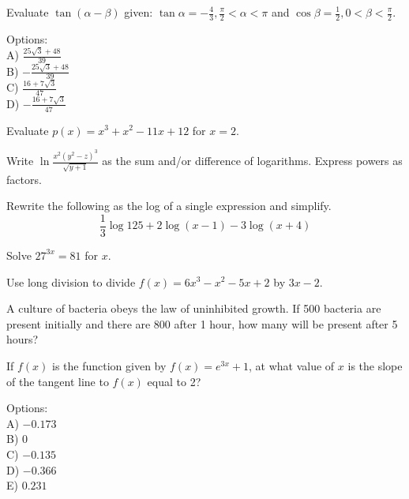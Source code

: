 \begin{problem}\label{AI-Trigonometry2}
Evaluate \( \tan(\alpha - \beta) \) given: \( \tan\alpha = -\frac{4}{3}, \frac{\pi}{2} < \alpha < \pi \) and \( \cos\beta = \frac{1}{2}, 0 < \beta < \frac{\pi}{2} \).

\noindent Options:\\
A) \( \frac{25\sqrt{3} + 48}{39} \)\\
B) \( -\frac{25\sqrt{3} + 48}{39} \)\\
C) \( \frac{16 + 7\sqrt{3}}{47} \)\\
D) \( -\frac{16 + 7\sqrt{3}}{47} \)
\end{problem}

\begin{problem}\label{PreCal-33}
 Evaluate $p(x)=x^{3}+x^{2}-11 x+12$ for $x=2$.
\end{problem}



\begin{problem}\label{PreCal-35}
Write $\ln \frac{x^{2}\left(y^{2}-z\right)^{3}}{\sqrt{y+1}}$ as the sum and/or difference of logarithms. Express powers as factors.
 \end{problem}


\begin{problem}\label{PreCal-36}
 Rewrite the following as the log of a single expression and simplify.
$$
\frac{1}{3} \log 125+2 \log (x-1)-3 \log (x+4)
$$
\end{problem}



\begin{problem}\label{PreCal-37}
 Solve $27^{3 x}=81$ for $x$.
\end{problem}


\begin{problem}\label{PreCal-38}
 Use long division to divide $f(x)=6 x^{3}-x^{2}-5 x+2$ by $3 x-2$.
\end{problem}




\begin{problem}\label{PreCal-40}
 A culture of bacteria obeys the law of uninhibited growth. If 500 bacteria are present initially and there are 800 after 1 hour, how many will be present after 5 hours?
\end{problem}




\begin{problem}\label{AI-Calculus2}
If \( f(x) \) is the function given by \( f(x) = e^{3x} + 1 \), at what value of \( x \) is the slope of the tangent line to \( f(x) \) equal to 2?

\noindent Options:\\
A) \( -0.173 \)\\
B) \( 0 \)\\
C) \( -0.135 \)\\
D) \( -0.366 \)\\
E) \( 0.231 \)
\end{problem}



